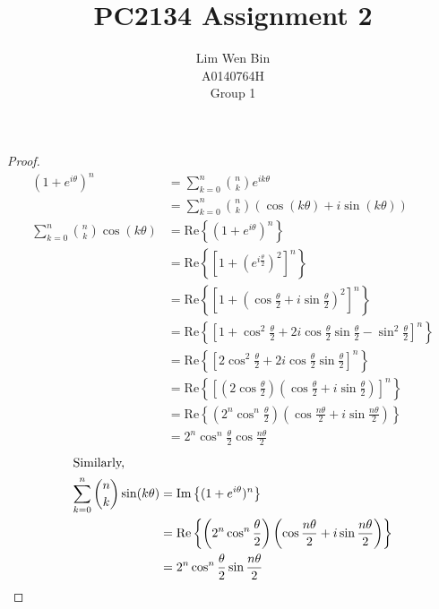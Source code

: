 \documentclass[12pt]{article}
\newenvironment{problem}[2][Problem]{\begin{trivlist}
\item[\hskip \labelsep {\bfseries #1}\hskip \labelsep {\bfseries #2.}]}{\end{trivlist}}
\begin{document}
\title{PC2134 Assignment 2}
\author{Lim Wen Bin \\
A0140764H\\
Group 1}
\maketitle

\begin{problem}{1}
\end{problem}
\begin{proof}
\begin{align*}
	(1 + e^{i\theta})^n &= \sum_{k=0}^n \binom{n}{k} e^{ik\theta} \\
	&= \sum_{k=0}^n \binom{n}{k} (\cos(k\theta) + i\sin(k\theta)) \\
	\sum_{k=0}^n \binom{n}{k} \cos(k\theta) &= \text{Re}\left\{ (1 +
		e^{i\theta})^n \right\}\\
	&= \text{Re}\left\{ [1 + (e^{i\frac{\theta}{2}})^2]^n \right\} \\
	&= \text{Re}\left\{ \left[1 + \left( \cos\frac{\theta}{2} 
		+ i\sin\frac{\theta}{2} \right)^2 \right]^n \right\} \\
	&= \text{Re}\left\{ \left[1 + \cos^2\frac{\theta}{2} 
		+ 2i\cos\frac{\theta}{2} \sin\frac{\theta}{2} 
		-\sin^2\frac{\theta}{2} \right]^n \right\} \\
	&= \text{Re}\left\{ \left[ 2\cos^2\frac{\theta}{2} 
		+ 2i\cos\frac{\theta}{2} \sin\frac{\theta}{2} 
		 \right]^n \right\} \\
	&= \text{Re}\left\{ \left[ \left( 2\cos\frac{\theta}{2} \right)
		\left( \cos\frac{\theta}{2} + i\sin\frac{\theta}{2} \right) 
		\right]^n \right\} \\
	&= \text{Re}\left\{ \left( 2^n\cos^n\frac{\theta}{2} \right)
		\left( \cos\frac{n\theta}{2} + i\sin\frac{n\theta}{2} \right) 
		\right\} \\
	&= 2^n\cos^n\frac{\theta}{2} \cos\frac{n\theta}{2}
\end{align*}
\filbreak
\begin{align*}
	\intertext{Similarly,}
	\sum_{k=0}^n \binom{n}{k} \sin(k\theta) &= \text{Im}\left\{ (1 +
		e^{i\theta})^n \right\}\\
	&= \text{Re}\left\{ \left( 2^n\cos^n\frac{\theta}{2} \right)
		\left( \cos\frac{n\theta}{2} + i\sin\frac{n\theta}{2} \right) 
		\right\} \\
	&= 2^n\cos^n\frac{\theta}{2} \sin\frac{n\theta}{2}
\end{align*}
\end{proof}
\end{document}
